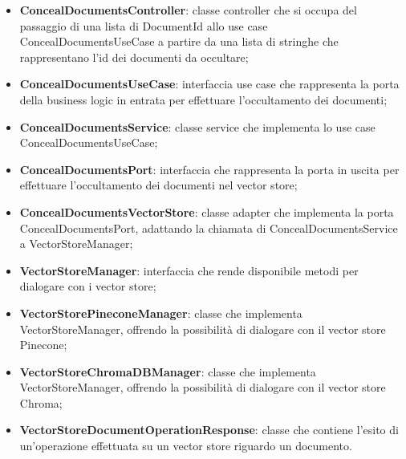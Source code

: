 \documentclass[10pt, a4paper]{article}
\begin{document}
\begin{itemize}
    \item \label{ConcealDocumentsController}\textbf{ConcealDocumentsController}: classe controller che si occupa del passaggio di una lista di DocumentId allo use case ConcealDocumentsUseCase a partire da una lista di stringhe che rappresentano l'id dei documenti da occultare;
    \item \label{ConcealDocumentsUseCase}\textbf{ConcealDocumentsUseCase}: interfaccia use case che rappresenta la porta della business logic in entrata per effettuare l'occultamento dei documenti;
    \item \label{ConcealDocumentsService}\textbf{ConcealDocumentsService}: classe service che implementa lo use case ConcealDocumentsUseCase;
    \item \label{ConcealDocumentsPort}\textbf{ConcealDocumentsPort}: interfaccia che rappresenta la porta in uscita per effettuare l'occultamento dei documenti nel vector store;
    \item \label{ConcealDocumentsVectorStore}\textbf{ConcealDocumentsVectorStore}: classe adapter che implementa la porta ConcealDocumentsPort, adattando la chiamata di ConcealDocumentsService a VectorStoreManager;
    \item \label{VectorStoreManager}\textbf{VectorStoreManager}: interfaccia che rende disponibile metodi per dialogare con i vector store;
    \item \label{VectorStorePineconeManager}\textbf{VectorStorePineconeManager}: classe che implementa VectorStoreManager, offrendo la possibilità di dialogare con il vector store Pinecone;
    \item \label{VectorStoreChromaDBManager}\textbf{VectorStoreChromaDBManager}: classe che implementa VectorStoreManager,  offrendo la possibilità di dialogare con il vector store Chroma;
    \item \label{VectorStoreDocumentOperationResponse}\textbf{VectorStoreDocumentOperationResponse}: classe che contiene l'esito di un'operazione effettuata su un vector store riguardo un documento.
\end{itemize}
\end{document}
